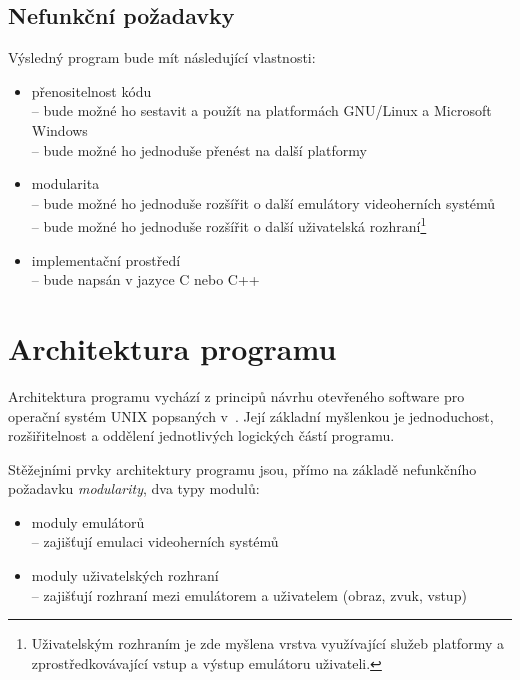 %
%

\subsection{Nefunkční požadavky}

Výsledný program bude mít následující vlastnosti:
\begin{itemize}
	\item přenositelnost kódu \\
		\--- bude možné ho sestavit a použít na platformách GNU/Linux a
			Microsoft Windows \\
		\--- bude možné ho jednoduše přenést na další platformy

	\item modularita \\
		\--- bude možné ho jednoduše rozšířit o další emulátory videoherních
			systémů \\
		\--- bude možné ho jednoduše rozšířit o další uživatelská
			rozhraní\footnote{Uživatelským rozhraním je zde myšlena vrstva
			využívající služeb platformy a zprostředkovávající vstup a výstup
			emulátoru uživateli.}

	\item implementační prostředí \\
		\--- bude napsán v jazyce C nebo C++
\end{itemize}


\section{Architektura programu}\label{chap:anal_architecture}

Architektura programu vychází z principů návrhu otevřeného software pro
operační systém UNIX popsaných v~\cite{Raymond04}. Její základní myšlenkou je
jednoduchost, rozšiřitelnost a oddělení jednotlivých logických částí programu.

Stěžejními prvky architektury programu jsou, přímo na základě nefunkčního
požadavku {\em modularity}, dva typy modulů:

\begin{itemize}
\item moduly emulátorů \\
	\--- zajišťují emulaci videoherních systémů
\item moduly uživatelských rozhraní \\
	\--- zajišťují rozhraní mezi emulátorem a uživatelem (obraz, zvuk, vstup)
\end{itemize}

